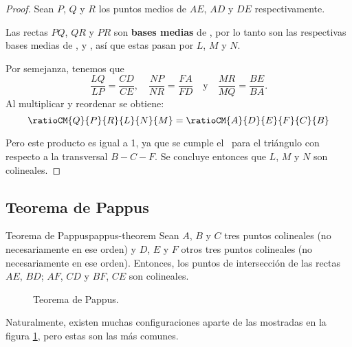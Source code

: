 \begin{proof}
    Sean $P$, $Q$ y $R$ los puntos medios de $AE$, $AD$ y $DE$ respectivamente.

    \begin{multicols}{2}
        \begin{figure}[H]
            \centering
            
        \end{figure}

        Las rectas $PQ$, $QR$ y $PR$ son \textbf{bases medias} de , por lo tanto son las respectivas bases medias de ,  y , así que estas pasan por $L$, $M$ y $N$.

        Por semejanza, tenemos que
        \[
            \frac{LQ}{LP} = \frac{CD}{CE},\quad \frac{NP}{NR} = \frac{FA}{FD}\quad \text{y} \quad \frac{MR}{MQ} = \frac{BE}{BA}.
        \]
        Al multiplicar y reordenar se obtiene:
        \[
            \ratioCM{Q}{P}{R}{L}{N}{M} = \ratioCM{A}{D}{E}{F}{C}{B}
        \]
    \end{multicols}

    Pero este producto es igual a 1, ya que se cumple el~ para el triángulo  con respecto a la transversal $B - C - F$.
    Se concluye entonces que $L$, $M$ y $N$ son colineales.
\end{proof}




\subsection{Teorema de Pappus}

\begin{section-theorem.tcb}{Teorema de Pappus}{pappus-theorem}
    Sean $A$, $B$ y $C$ tres puntos colineales (no necesariamente en ese orden) y $D$, $E$ y $F$ otros tres puntos colineales (no necesariamente en ese orden).
    Entonces, los puntos de intersección de las rectas $AE$, $BD$; $AF$, $CD$ y $BF$, $CE$ son colineales.
\end{section-theorem.tcb}

\begin{figure}[H]
    \centering
    
    \caption{Teorema de Pappus.}
    \label{fig:pappus-theorem}
\end{figure}

Naturalmente, existen muchas configuraciones aparte de las mostradas en la figura \ref{fig:pappus-theorem}, pero estas son las más comunes.


